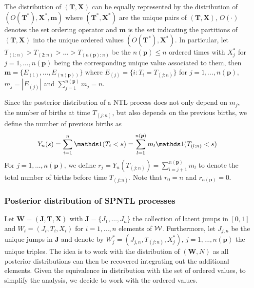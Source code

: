 The distribution of $(\boldsymbol{T}, \boldsymbol{X})$ can be equally represented by the distribution of $(O(\boldsymbol{T}^*), \boldsymbol{X}^*, \boldsymbol{m})$ where $(\boldsymbol{T}^*, \boldsymbol{X}^*)$ are the unique pairs of $(\boldsymbol{T}, \boldsymbol{X})$, $O(\cdot)$ denotes the set ordering operator and $\boldsymbol{m}$ is the set indicating the partitions of $(\boldsymbol{T}, \boldsymbol{X})$ into the unique ordered values $(O(\boldsymbol{T}^*), \boldsymbol{X}^*)$. In particular, let $T_{(1:n)} > T_{(2:n)} > \ldots > T_{(n(\boldsymbol{p}):n)}$ be the $n(\boldsymbol{p}) \leq n$ ordered times with $X_j^*$ for $j=1, \ldots, n(\boldsymbol{p})$ being the corresponding unique value associated to them, then $\boldsymbol{m} = \{E_{(1)}, \ldots, E_{(n(\boldsymbol{p}))}\}$ where $E_{(j)} = \{i : T_i = T_{(j:n)}\}$ for $j=1, \ldots, n(\boldsymbol{p})$, $m_j = |E_{(j)}|$ and $\sum_{j=1}^{n(\boldsymbol{p})} m_j = n$. 

Since the posterior distribution of a NTL process does not only depend on $m_j$, the number of births at time $T_{(j:n)}$, but also depends on the previous births, we define the number of previous births as
\begin{equation*}
Y_n(s) = \sum_{i=1}^n \indicator(T_i < s) = \sum_{l=1}^{n(\boldsymbol{p})} m_l \indicator(T_{(l:n)} < s)
\end{equation*}
For $j=1, \ldots, n(\boldsymbol{p})$, we define $r_j = Y_n(T_{(j:n)}) = \sum_{l=j+1}^{n(\boldsymbol{p})} m_l$ to denote the total number of births before time $T_{(j:n)}$. Note that $r_0 = n$ and $r_{n(\boldsymbol{p})} = 0$.

\subsubsection{Posterior distribution of SPNTL processes} \label{SPNTL_posterior_proof}
Let $\boldsymbol{W} = (\boldsymbol{J}, \boldsymbol{T}, \boldsymbol{X})$ with $\boldsymbol{J} = \{J_1, \ldots, J_n\}$ the collection of latent jumps in $[0,1]$ and $W_i = (J_i, T_i, X_i)$ for $i=1, \ldots, n$ elements of $\mathcal{W}$. Furthermore, let $J_{j,n}$ be the unique jumps in $\boldsymbol{J}$  and denote by $W_j^* = (J_{j,n}, T_{(j:n)}, X_j^*)$, $j=1, \ldots, n(\boldsymbol{p})$ the unique triples. The idea is to work with the distribution of $(\boldsymbol{W}, N)$ as all posterior distributions can then be recovered integrating out the additional elements. Given the equivalence in distribution with the set of ordered values, to simplify the analysis, we decide to work with the ordered values.

